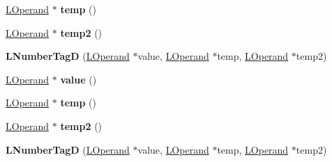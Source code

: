 \begin{DoxyCompactItemize}
\item 
\hyperlink{classv8_1_1internal_1_1_l_operand}{L\+Operand} $\ast$ {\bfseries temp} ()\hypertarget{classv8_1_1internal_1_1_l_number_tag_d_a2163f8b3c4bd0dbeb6700e6dc18aef2c}{}\label{classv8_1_1internal_1_1_l_number_tag_d_a2163f8b3c4bd0dbeb6700e6dc18aef2c}

\item 
\hyperlink{classv8_1_1internal_1_1_l_operand}{L\+Operand} $\ast$ {\bfseries temp2} ()\hypertarget{classv8_1_1internal_1_1_l_number_tag_d_a775756f64a64d70118275571bcd4469d}{}\label{classv8_1_1internal_1_1_l_number_tag_d_a775756f64a64d70118275571bcd4469d}

\item 
{\bfseries L\+Number\+TagD} (\hyperlink{classv8_1_1internal_1_1_l_operand}{L\+Operand} $\ast$value, \hyperlink{classv8_1_1internal_1_1_l_operand}{L\+Operand} $\ast$temp, \hyperlink{classv8_1_1internal_1_1_l_operand}{L\+Operand} $\ast$temp2)\hypertarget{classv8_1_1internal_1_1_l_number_tag_d_a67088b9bb50a700478235225d9d444e8}{}\label{classv8_1_1internal_1_1_l_number_tag_d_a67088b9bb50a700478235225d9d444e8}

\item 
\hyperlink{classv8_1_1internal_1_1_l_operand}{L\+Operand} $\ast$ {\bfseries value} ()\hypertarget{classv8_1_1internal_1_1_l_number_tag_d_a46629ef102a26f699165889f0cc36f88}{}\label{classv8_1_1internal_1_1_l_number_tag_d_a46629ef102a26f699165889f0cc36f88}

\item 
\hyperlink{classv8_1_1internal_1_1_l_operand}{L\+Operand} $\ast$ {\bfseries temp} ()\hypertarget{classv8_1_1internal_1_1_l_number_tag_d_a2163f8b3c4bd0dbeb6700e6dc18aef2c}{}\label{classv8_1_1internal_1_1_l_number_tag_d_a2163f8b3c4bd0dbeb6700e6dc18aef2c}

\item 
\hyperlink{classv8_1_1internal_1_1_l_operand}{L\+Operand} $\ast$ {\bfseries temp2} ()\hypertarget{classv8_1_1internal_1_1_l_number_tag_d_a775756f64a64d70118275571bcd4469d}{}\label{classv8_1_1internal_1_1_l_number_tag_d_a775756f64a64d70118275571bcd4469d}

\item 
{\bfseries L\+Number\+TagD} (\hyperlink{classv8_1_1internal_1_1_l_operand}{L\+Operand} $\ast$value, \hyperlink{classv8_1_1internal_1_1_l_operand}{L\+Operand} $\ast$temp, \hyperlink{classv8_1_1internal_1_1_l_operand}{L\+Operand} $\ast$temp2)\hypertarget{classv8_1_1internal_1_1_l_number_tag_d_a67088b9bb50a700478235225d9d444e8}{}\label{classv8_1_1internal_1_1_l_number_tag_d_a67088b9bb50a700478235225d9d444e8}


\end{DoxyCompactItemize}
